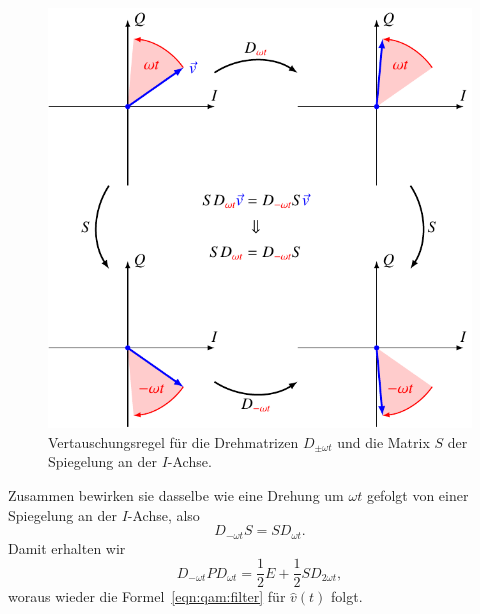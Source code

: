 \begin{figure}
\centering
\includegraphics{applications/qam/spiegelung.pdf}
\caption{Vertauschungsregel für die Drehmatrizen $D_{\pm\omega t}$ und
die Matrix $S$ der Spiegelung an der $I$-Achse.
\label{figure:qam:spiegelung}}
\end{figure}
Zusammen bewirken sie dasselbe wie eine Drehung um $\omega t$ gefolgt
von einer Spiegelung an der $I$-Achse, also
\[
D_{-\omega t}S=SD_{\omega t}.
\]
Damit erhalten wir
\[
D_{-\omega t}PD_{\omega t}
=
\frac12E + \frac12 SD_{2\omega t},
\]
woraus wieder die Formel~\eqref{eqn:qam:filter}
für $\hat{v}(t)$ folgt.

